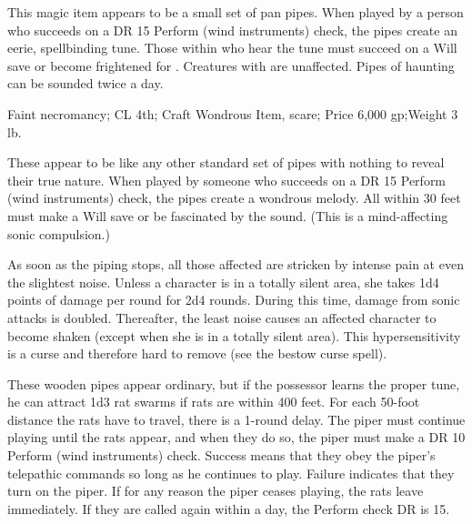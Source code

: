 {\begin{comment}
The pearl enables its possessor to breathe in water as if she were in clean, fresh air. Her swim speed is 60 feet, and she can cast spells and act underwater without hindrance.

Moderate abjuration and transmutation; CL 8th; Craft Wondrous Item, freedom of movement, water breathing; Price 15,300 gp.
\end{comment}

 This magic item appears to be a small set of pan pipes. When played by a person who succeeds on a DR 15 Perform (wind instruments) check, the pipes create an eerie, spellbinding tune. Those within  who hear the tune must succeed on a Will save or become frightened for . Creatures with  are unaffected. Pipes of haunting can be sounded twice a day.

Faint necromancy; CL 4th; Craft Wondrous Item, scare; Price 6,000 gp;Weight 3 lb.

 These appear to be like any other standard set of pipes with nothing to reveal their true nature. When played by someone who succeeds on a DR 15 Perform (wind instruments) check, the pipes create a wondrous melody. All within 30 feet must make a Will save or be fascinated by the sound. (This is a mind-affecting sonic compulsion.)

As soon as the piping stops, all those affected are stricken by intense pain at even the slightest noise. Unless a character is in a totally silent area, she takes 1d4 points of damage per round for 2d4 rounds. During this time, damage from sonic attacks is doubled. Thereafter, the least noise causes an affected character to become shaken (except when she is in a totally silent area). This hypersensitivity is a curse and therefore hard to remove (see the bestow curse spell).


 These wooden pipes appear ordinary, but if the possessor learns the proper tune, he can attract 1d3 rat swarms if rats are within 400 feet. For each 50-foot distance the rats have to travel, there is a 1-round delay. The piper must continue playing until the rats appear, and when they do so, the piper must make a DR 10 Perform (wind instruments) check. Success means that they obey the piper's telepathic commands so long as he continues to play. Failure indicates that they turn on the piper. If for any reason the piper ceases playing, the rats leave immediately. If they are called again within a day, the Perform check DR is 15.

}
